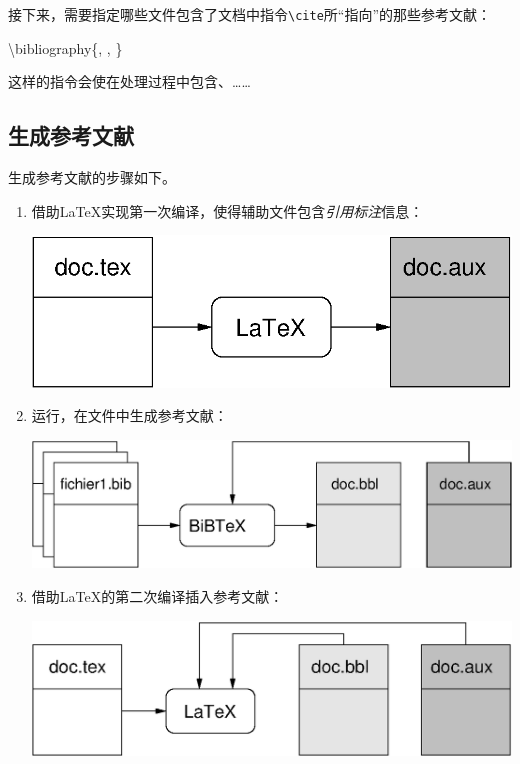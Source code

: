 接下来，需要指定哪些文件包含了文档中指令\verb|\cite|所``指向''的那些参考文献：

\begin{dmd}
\backslash bibliography\{, , \}
\end{dmd}

这样的指令会使\bib 在处理过程中包含、……

\subsection{生成参考文献}

生成参考文献的步骤如下。

\begin{enumerate}
    \item 借助\LaTeX 实现第一次编译，使得辅助文件包含\emph{引用标注}信息：
    
    \begin{center}
        \includegraphics{img/bibtex1}
    \end{center}
    
    \item 运行\bib ，在文件中生成参考文献：
    

    \begin{center}
        \includegraphics{img/bibtex2}
    \end{center}

    \item 借助\LaTeX 的第二次编译插入参考文献：
    
    \begin{center}
        \includegraphics{img/bibtex3}
    \end{center}


\end{enumerate}
